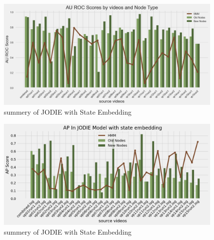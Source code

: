 \clearpage

\begin{figure}
    \centering
    \includegraphics[width=\textwidth]{figures/05_JODIE_state_HMM_AUROC.png}
    \caption{summery of JODIE with State Embedding}
    \label{fig:JODIE_state_HMM_AUROC}
\end{figure}



\begin{figure}
    \centering
    \includegraphics[width=\textwidth]{figures/05_JODIE_state_HMM_AP.png}
    \caption{summery of JODIE with State Embedding}
    \label{fig:JODIE_state_HMM_AP}
\end{figure}

